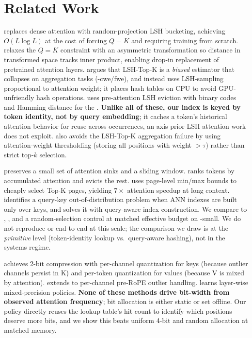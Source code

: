 \section{Related Work}
\label{sec:related}

  \citep{kitaev2020reformer} replaces dense attention with random-projection LSH bucketing, achieving $O(L \log L)$ at the cost of forcing $Q = K$ and requiring training from scratch. \smyrf \citep{daras2020smyrf} relaxes the $Q=K$ constraint with an asymmetric transformation so distance in transformed space tracks inner product, enabling drop-in replacement of pretrained attention layers. \magicpig \citep{chen2024magicpig} argues that LSH-Top-K is a \emph{biased} estimator that collapses on aggregation tasks (-cwe/fwe), and instead uses LSH-sampling proportional to attention weight; it places hash tables on CPU to avoid GPU-unfriendly hash operations. \hashevict \citep{liu2024hashevict} uses pre-attention LSH eviction with binary codes and Hamming distance for the \kvcache. {\bf Unlike all of these, our index is keyed by token identity, not by query embedding}; it caches a token's historical attention behavior for reuse across occurrences, an axis prior LSH-attention work does not exploit. \hma also avoids the LSH-Top-K aggregation failure by using attention-weight thresholding (\eg storing all positions with weight $> \tau$) rather than strict top-$k$ selection.

 \streaming \citep{xiao2023streamingllm} preserves a small set of attention sinks and a sliding window. \hto \citep{zhang2023h2o} ranks tokens by accumulated attention and evicts the rest. \quest \citep{tang2024quest} uses page-level min/max bounds to cheaply select Top-K pages, yielding $7\times$ attention speedup at long context. \cite{liu2024retrievalattention} identifies a query-key out-of-distribution problem when ANN indexes are built only over keys, and solves it with query-aware index construction. We compare \hma to \streaming, \hto, and a random-selection control at matched effective budget on \gpttwo-small. We do not reproduce \quest or \magicpig end-to-end at this scale; the comparison we draw is at the \emph{primitive} level (token-identity lookup vs.\ query-aware hashing), not in the systems regime.

 \kivi \citep{liu2024kivi} achieves 2-bit \kvcache compression with per-channel quantization for keys (because outlier channels persist in K) and per-token quantization for values (because V is mixed by attention). \kvquant \citep{hooper2024kvquant} extends to per-channel pre-RoPE outlier handling. \cite{kvtuner2025} learns layer-wise mixed-precision policies. {\bf None of these methods drive bit-width from observed attention frequency}; bit allocation is either static or set offline. Our \hmaquant policy directly reuses the lookup table's hit count to identify which positions deserve more bits, and we show this beats uniform 4-bit and random allocation at matched memory.

